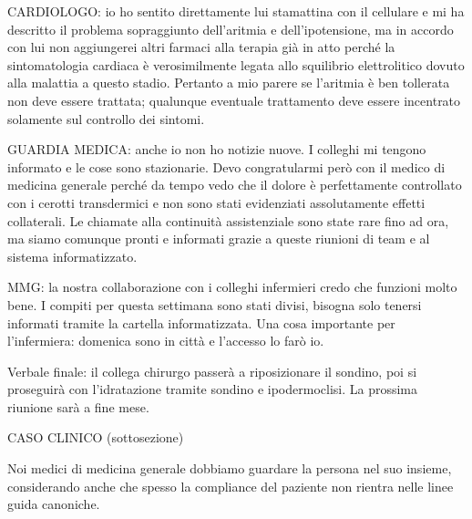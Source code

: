 \documentclass[]{article}
\begin{document}
CARDIOLOGO: io ho sentito direttamente lui stamattina con il cellulare e
mi ha descritto il problema sopraggiunto dell'aritmia e
dell'ipotensione, ma in accordo con lui non aggiungerei altri farmaci
alla terapia già in atto perché la sintomatologia cardiaca è
verosimilmente legata allo squilibrio elettrolitico dovuto alla malattia
a questo stadio. Pertanto a mio parere se l'aritmia è ben tollerata non
deve essere trattata; qualunque eventuale trattamento deve essere
incentrato solamente sul controllo dei sintomi.

GUARDIA MEDICA: anche io non ho notizie nuove. I colleghi mi tengono
informato e le cose sono stazionarie. Devo congratularmi però con il
medico di medicina generale perché da tempo vedo che il dolore è
perfettamente controllato con i cerotti transdermici e non sono stati
evidenziati assolutamente effetti collaterali. Le chiamate alla
continuità assistenziale sono state rare fino ad ora, ma siamo comunque
pronti e informati grazie a queste riunioni di team e al sistema
informatizzato.

MMG: la nostra collaborazione con i colleghi infermieri credo che
funzioni molto bene. I compiti per questa settimana sono stati divisi,
bisogna solo tenersi informati tramite la cartella informatizzata. Una
cosa importante per l'infermiera: domenica sono in città e l'accesso lo
farò io.

Verbale finale: il collega chirurgo passerà a riposizionare il sondino,
poi si proseguirà con l'idratazione tramite sondino e ipodermoclisi. La
prossima riunione sarà a fine mese.

CASO CLINICO (sottosezione)

Noi medici di medicina generale dobbiamo guardare la persona nel suo
insieme, considerando anche che spesso la compliance del paziente non
rientra nelle linee guida canoniche.
\end{document}
